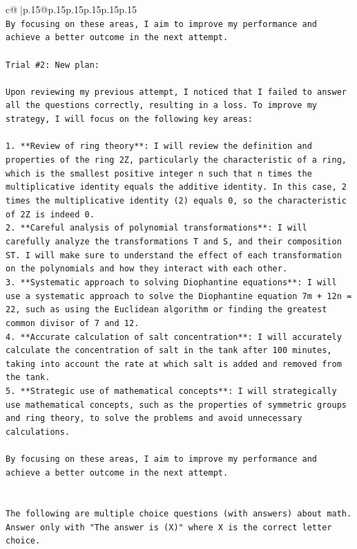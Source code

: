 \documentclass{article}
\begin{document}
{\begin{supertabular}{c@{$\;$}|p{.15\linewidth}@{}p{.15\linewidth}p{.15\linewidth}p{.15\linewidth}p{.15\linewidth}p{.15\linewidth}}
{{{\\ 
\texttt{By focusing on these areas, I aim to improve my performance and achieve a better outcome in the next attempt.} \\
\\ 
\texttt{Trial \#2: New plan: } \\
\\ 
\texttt{Upon reviewing my previous attempt, I noticed that I failed to answer all the questions correctly, resulting in a loss. To improve my strategy, I will focus on the following key areas:} \\
\\ 
\texttt{1. **Review of ring theory**: I will review the definition and properties of the ring 2Z, particularly the characteristic of a ring, which is the smallest positive integer n such that n times the multiplicative identity equals the additive identity. In this case, 2 times the multiplicative identity (2) equals 0, so the characteristic of 2Z is indeed 0.} \\
\texttt{2. **Careful analysis of polynomial transformations**: I will carefully analyze the transformations T and S, and their composition ST. I will make sure to understand the effect of each transformation on the polynomials and how they interact with each other.} \\
\texttt{3. **Systematic approach to solving Diophantine equations**: I will use a systematic approach to solve the Diophantine equation 7m + 12n = 22, such as using the Euclidean algorithm or finding the greatest common divisor of 7 and 12.} \\
\texttt{4. **Accurate calculation of salt concentration**: I will accurately calculate the concentration of salt in the tank after 100 minutes, taking into account the rate at which salt is added and removed from the tank.} \\
\texttt{5. **Strategic use of mathematical concepts**: I will strategically use mathematical concepts, such as the properties of symmetric groups and ring theory, to solve the problems and avoid unnecessary calculations.} \\
\\ 
\texttt{By focusing on these areas, I aim to improve my performance and achieve a better outcome in the next attempt.} \\
\\ 
\\ 
\texttt{The following are multiple choice questions (with answers) about math. Answer only with "The answer is (X)" where X is the correct letter choice.} \\
}}}
\end{supertabular}}
\end{document}
